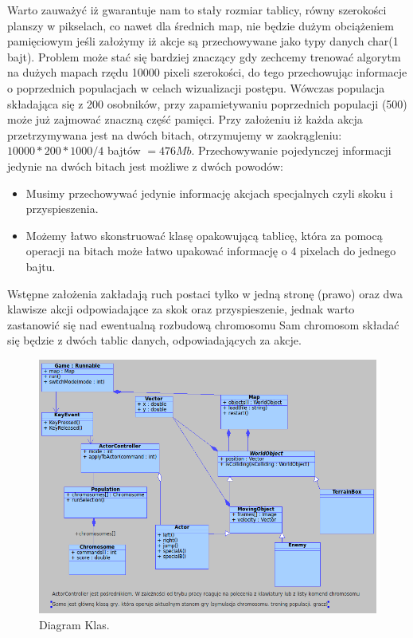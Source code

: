 \begin{par}
\begin{enumerate}
\begin{par}
		Warto zauważyć iż gwarantuje nam to stały rozmiar tablicy, równy szerokości planszy w pikselach, co nawet dla średnich map, nie będzie dużym obciążeniem pamięciowym jeśli założymy iż akcje są przechowywane jako typy danych char(1 bajt). 
		Problem może stać się bardziej znaczący gdy zechcemy trenować algorytm na dużych mapach rzędu 10000 pixeli szerokości, do tego przechowując informacje o poprzednich populacjach w celach wizualizacji postępu.
		Wówczas populacja składająca się z 200 osobników, przy zapamietywaniu poprzednich populacji (500) może już zajmować znaczną część pamięci.
		Przy założeniu iż każda akcja przetrzymywana jest na dwóch bitach, otrzymujemy w zaokrągleniu:
		$10000*200*1000/4$ bajtów $= 476Mb$.
		Przechowywanie pojedynczej informacji jedynie na dwóch bitach jest możliwe z dwóch powodów:
		\begin{itemize}	
		\item
			Musimy przechowywać jedynie informację akcjach specjalnych czyli skoku i przyspieszenia.
		\item
			Możemy łatwo skonstruować klasę opakowującą tablicę, która za pomocą operacji na bitach może łatwo upakować informację o 4 pixelach do jednego bajtu.
		\end{itemize}

	\end{par}
	\end{enumerate}
	\begin{par}
		Wstępne założenia zakładają ruch postaci tylko w jedną stronę (prawo) oraz dwa klawisze akcji odpowiadające za skok oraz przyspieszenie, jednak warto zastanowić się nad ewentualną rozbudową chromosomu Sam chromosom składać się będzie z dwóch tablic danych, odpowiadających za akcje.

	\end{par}
	\begin{figure}[h]
	\centering
	\includegraphics[width=\textwidth]{obrazki/diagram_klas.png}
	\caption{Diagram Klas.}
	\label{fig:diagram_klas}
	\end{figure}
\end{par}
